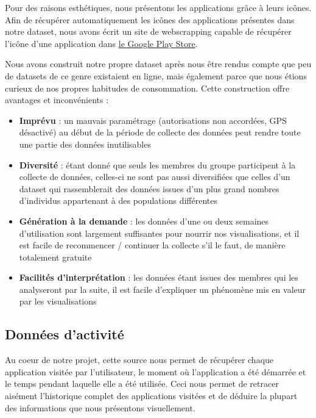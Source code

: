 \documentclass[a4paper, 11pt]{article}
\begin{document}
        Pour des raisons esthétiques, nous présentons les applications grâce à leurs icônes. Afin de récupérer automatiquement les icônes des applications présentes dans notre dataset, nous avons écrit un site de webscrapping capable de récupérer l'icône d'une application dans \href{https://play.google.com/store/apps?hl=fr}{le Google Play Store}.

        Nous avons construit notre propre dataset après nous être rendus compte que peu de datasets de ce genre existaient en ligne, mais également parce que nous étions curieux de nos propres habitudes de consommation. Cette construction offre avantages et inconvénients :
        \begin{itemize}
            \item \textbf{\color{red} Imprévu} : un mauvais paramétrage (autorisations non accordées, GPS désactivé) au début de la période de collecte des données peut rendre toute une partie des données inutilisables
            \item \textbf{\color{red} Diversité} : étant donné que seuls les membres du groupe participent à la collecte de données, celles-ci ne sont pas aussi diversifiées que celles d'un dataset qui rassemblerait des données issues d'un plus grand nombres d'individus appartenant à des populations différentes
            \item \textbf{\color{green} Génération à la demande} : les données d'une ou deux semaines d'utilisation sont largement suffisantes pour nourrir nos visualisations, et il est facile de recommencer / continuer la collecte s'il le faut, de manière totalement gratuite
            \item \textbf{\color{green} Facilités d'interprétation} : les données étant issues des membres qui les analyseront par la suite, il est facile d'expliquer un phénomène mis en valeur par les visualisations
        \end{itemize}

        \subsection{Données d'activité}
        Au coeur de notre projet, cette source nous permet de récupérer chaque application visitée par l'utilisateur, le moment où l'application a été démarrée et le temps pendant laquelle elle a été utilisée. Ceci nous permet de retracer aisément l'historique complet des applications visitées et de déduire la plupart des informations que nous présentons visuellement.
\end{document}
